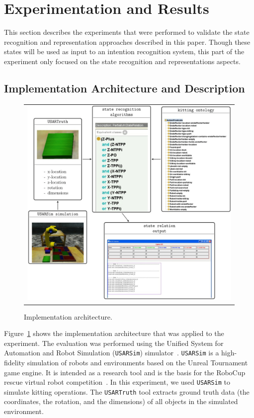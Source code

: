 \documentclass[preprint,12pt]{elsarticle}
\begin{document}
\section{Experimentation and Results}\label{S:section5}

This section describes the experiments that were performed to validate the state recognition and representation approaches described in this paper. Though these states will be used as input to an intention recognition system, this part of the experiment only focused on the state recognition and representations aspects.

\subsection{Implementation Architecture and Description}

\begin{figure}[t!h!]
\begin{tabular}{c}
\includegraphics[width=13cm]{architecture.eps}
\end{tabular}
\caption{Implementation architecture.}
\label{fig:architecture}
\end{figure}
Figure~\ref{fig:architecture} shows the implementation architecture that was applied to the experiment. The evaluation was performed using the Unified System for Automation and Robot Simulation (\texttt{USARSim}) simulator~\cite{Carpin.ICRA.2007}. \texttt{USARSim} is a high-fidelity simulation of robots and environments based on the Unreal Tournament game engine. It is intended as a research tool and is the basis for the RoboCup rescue virtual robot competition~\cite{Kitano.ICAA.1997}. In this experiment, we used \texttt{USARSim} to simulate kitting operations. The \texttt{USARTruth} tool extracts ground truth data (the coordinates, the rotation, and the dimensions) of all objects in the simulated environment.
\end{document}
